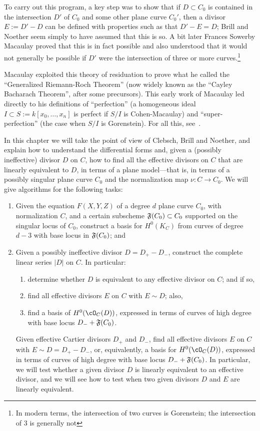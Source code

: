 To carry out this program, a key step was to show that if $D\subset C_0$ is contained in the intersection
$D'$ of $C_0$ and some other plane curve $C_0'$, then a divisor 
$E := D'-D$ can be defined with properties such as that $D'-E = D$; Brill and Noether seem simply to have assumed that this is so. A bit later Frances Sowerby Macaulay proved that this is in fact possible  and also understood that it would not generally be possible if $D'$ were the intersection of three or more curves.\footnote{In modern terms, the intersection of two curves is Gorenstein; the intersection of 3 is generally not}

Macaulay exploited this theory of residuation  to prove what he called the ``Generalized Riemann-Roch Theorem'' (now widely known as the ``Cayley Bacharach Theorem'', after some precursors). This early work of Macaulay led directly to his definitions of  ``perfection'' (a homogeneous ideal
$I  \subset S:= k[x_0, \dots, x_n]$ is perfect if $S/I$ is Cohen-Macaulay) and ``super-perfection'' (the case when $S/I$ is
Gorenstein). For all this, see~\cite{Eisenbud-Gray}.

In this chapter we will take the point of view of Clebsch, Brill and Noether, and explain how to understand 
the differential forms and, given a (possibly ineffective) divisor $D$ on $C$, how to find all the 
effective divisors on $C$ that are linearly equivalent to $D$, in terms of a plane model---that is, 
in terms of a possibly singular plane curve $C_{0}$ and the normalization map $\nu: C\to C_{0}$.
We will give algorithms for the following tasks:

\begin{enumerate}
\item Given the equation $F(X,Y,Z)$ of a degree $d$ plane curve $C_0$, with normalization $C$,
and a certain subscheme $\adj(C_{0})\subset C_{0}$ supported on the singular locus of $C_{0}$,
construct a basis for $H^0(K_C)$ from curves of degree $d-3$ with base locus in $\adj(C_{0})$; and

\item  Given a possibly ineffective divisor $D = D_{+}-D_{-}$, construct the complete linear series $|D|$ on $C$. In particular:
\begin{enumerate}
\item determine whether $D$ is equivalent to any effective divisor on $C$; and if so,
 \item find all effective divisors $E$ on $C$ with $E \sim D$; also,
 \item find a basis of $H^0(\cO_C(D))$, expressed in terms of curves of high degree with  base locus $D_{-}+\adj(C_{0})$.
\end{enumerate}
Given effective Cartier divisors $D_{+}$ and $D_{-}$, find all effective divisors $E$ on $C$ with $E \sim D = D_{+}- D_{-}$, or, equivalently, a basis for $H^0(\cO_C(D))$, expressed in terms of curves of high degree with  base locus $D_{-}+\adj(C_{0})$. In particular, we will test whether a given divisor $D$ is linearly equivalent to an effective divisor, and we will see how to test when two given divisors $D$ and $E$ are linearly equivalent. 
\end{enumerate}

